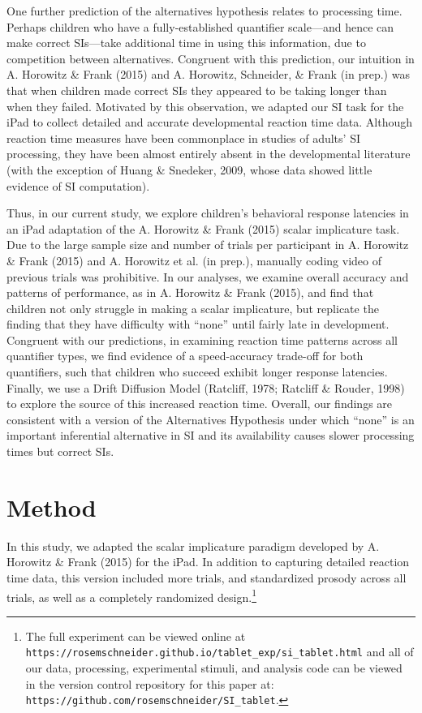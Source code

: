 \documentclass[10pt, letterpaper]{article}
\begin{document}
One further prediction of the alternatives hypothesis relates to
processing time. Perhaps children who have a fully-established
quantifier scale---and hence can make correct SIs---take additional time
in using this information, due to competition between alternatives.
Congruent with this prediction, our intuition in A. Horowitz \& Frank
(2015) and A. Horowitz, Schneider, \& Frank (in prep.) was that when
children made correct SIs they appeared to be taking longer than when
they failed. Motivated by this observation, we adapted our SI task for
the iPad to collect detailed and accurate developmental reaction time
data. Although reaction time measures have been commonplace in studies
of adults' SI processing, they have been almost entirely absent in the
developmental literature (with the exception of Huang \& Snedeker, 2009,
whose data showed little evidence of SI computation).

Thus, in our current study, we explore children's behavioral response
latencies in an iPad adaptation of the A. Horowitz \& Frank (2015)
scalar implicature task. Due to the large sample size and number of
trials per participant in A. Horowitz \& Frank (2015) and A. Horowitz et
al. (in prep.), manually coding video of previous trials was
prohibitive. In our analyses, we examine overall accuracy and patterns
of performance, as in A. Horowitz \& Frank (2015), and find that
children not only struggle in making a scalar implicature, but replicate
the finding that they have difficulty with ``none'' until fairly late in
development. Congruent with our predictions, in examining reaction time
patterns across all quantifier types, we find evidence of a
speed-accuracy trade-off for both quantifiers, such that children who
succeed exhibit longer response latencies. Finally, we use a Drift
Diffusion Model (Ratcliff, 1978; Ratcliff \& Rouder, 1998) to explore
the source of this increased reaction time. Overall, our findings are
consistent with a version of the Alternatives Hypothesis under which
``none'' is an important inferential alternative in SI and its
availability causes slower processing times but correct SIs.

\section{Method}\label{method}

In this study, we adapted the scalar implicature paradigm developed by
A. Horowitz \& Frank (2015) for the iPad. In addition to capturing
detailed reaction time data, this version included more trials, and
standardized prosody across all trials, as well as a completely
randomized
design.\footnote{The full experiment can be viewed online at \texttt{https://rosemschneider.github.io/tablet\_exp/si\_tablet.html} and all of our data, processing, experimental stimuli, and analysis code can be viewed in the version control repository for this paper at: \texttt{https://github.com/rosemschneider/SI\_tablet}.}
\end{document}
